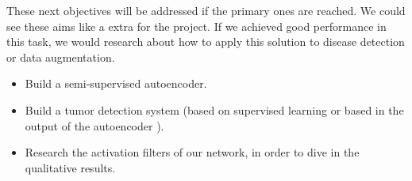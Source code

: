 These next objectives will be addressed if the primary ones are reached. We could see these aims like a extra for the project. If we achieved good performance in this task, we would research about how to apply this solution to disease detection or data augmentation.

\begin{itemize}
    \item Build a semi-supervised autoencoder.
    \item Build a tumor detection system (based on supervised learning or based in the output of the autoencoder \cite{pinaya2019}).
    \item Research the activation filters of our network, in order to dive in the qualitative results.
\end{itemize}

